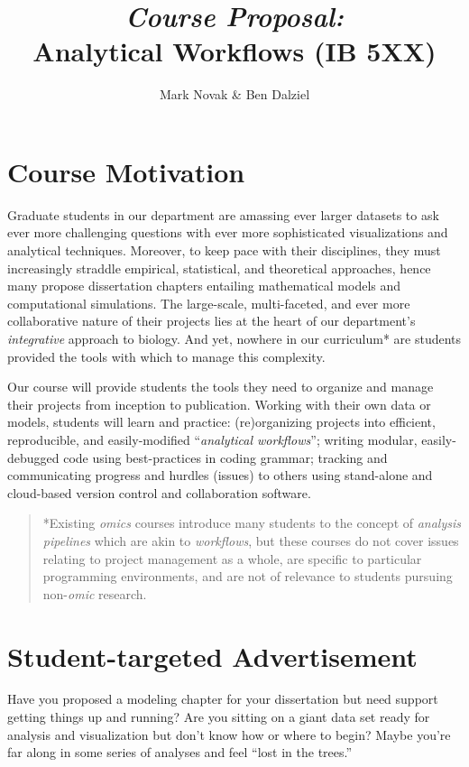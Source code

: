 \documentclass[10pt]{article}
\author{Mark Novak \& Ben Dalziel}
\title{\emph{Course Proposal:}\\Analytical Workflows (IB 5XX)}
\date{}
\begin{document}
\maketitle

\section*{Course Motivation}
Graduate students in our department are amassing ever larger datasets to ask ever more challenging questions with ever more sophisticated visualizations and analytical techniques.   Moreover, to keep pace with their disciplines, they must increasingly straddle empirical, statistical, and theoretical approaches, hence many propose dissertation chapters entailing mathematical models and computational simulations.  The large-scale, multi-faceted, and ever more collaborative nature of their projects lies at the heart of our department's \emph{integrative} approach to biology.  And yet, nowhere in our curriculum* are students provided the tools with which to manage this complexity.

Our course will provide students the tools they need to organize and manage their projects from inception to publication.  Working with their own data or models, students will learn and practice: (re)organizing projects into efficient, reproducible, and easily-modified ``\emph{analytical workflows}''; writing modular, easily-debugged code using best-practices in coding grammar; tracking and communicating progress and hurdles (issues) to others using stand-alone and cloud-based version control and collaboration software.

\begin{quote}
	*Existing \emph{omics} courses introduce many students to the concept of \emph{analysis pipelines} which are akin to \emph{workflows}, but these courses do not cover issues relating to project management as a whole, are specific to particular programming environments, and are not of relevance to students pursuing non-\emph{omic} research.
\end{quote}


\section*{Student-targeted Advertisement}
Have you proposed a modeling chapter for your dissertation but need support getting things up and running?  Are you sitting on a giant data set ready for analysis and visualization but don't know how or where to begin?  Maybe you're far along in some series of analyses and feel ``lost in the trees.''
\end{document}
